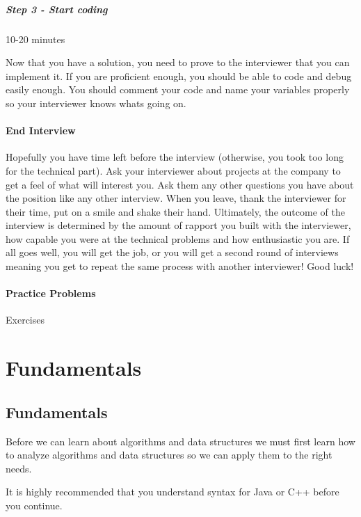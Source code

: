 \documentclass[11pt,oneside]{book}
\begin{document}
\subsubsection{Step 3 - Start coding}

10-20 minutes

Now that you have a solution, you need to prove to the interviewer that you can implement it. If you are
    proficient enough, you should be able to code and debug easily enough. You should comment your code
    and name your variables properly so your interviewer knows whats going on.

\subsection{End Interview}

Hopefully you have time left before the interview (otherwise, you took too long for the technical part). Ask your interviewer about projects at the company to get a feel of what will interest you. Ask them any other questions you have about the position like any other interview. When you leave, thank the interviewer for their time, put on a smile and shake their hand. Ultimately, the outcome of the interview is determined by the amount of rapport you built with the interviewer, how capable you were at the technical problems and how enthusiastic you are. If all goes well, you will get the job, or you will get a second round of interviews meaning you get to repeat the same process with another interviewer! Good luck!

\subsection{Practice Problems}

Exercises

\part{ Fundamentals }
    \chapter{ Fundamentals }
        

Before we can learn about algorithms and data structures we must first learn how to analyze algorithms and data structures so we can apply them to the right needs.

It is highly recommended that you understand syntax for Java or C++ before you continue.
\end{document}
